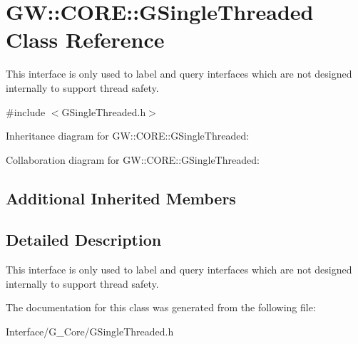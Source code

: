 \hypertarget{classGW_1_1CORE_1_1GSingleThreaded}{}\section{GW\+::C\+O\+RE\+::G\+Single\+Threaded Class Reference}
\label{classGW_1_1CORE_1_1GSingleThreaded}


This interface is only used to label and query interfaces which are not designed internally to support thread safety.  




{\ttfamily \#include $<$G\+Single\+Threaded.\+h$>$}



Inheritance diagram for GW\+::C\+O\+RE\+::G\+Single\+Threaded\+:


Collaboration diagram for GW\+::C\+O\+RE\+::G\+Single\+Threaded\+:
\subsection*{Additional Inherited Members}


\subsection{Detailed Description}
This interface is only used to label and query interfaces which are not designed internally to support thread safety. 

The documentation for this class was generated from the following file\+:\begin{DoxyCompactItemize}
\item 
Interface/\+G\+\_\+\+Core/G\+Single\+Threaded.\+h\end{DoxyCompactItemize}
